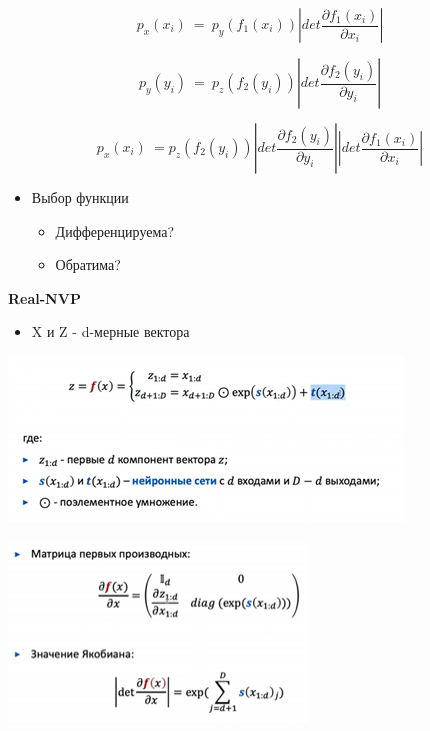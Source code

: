 \documentclass[a4paper, 12pt]{article}
\begin{document}
\[p_{x}(x_{i})\  = \ p_{y}(f_{1}(x_{i}))|det\frac{\partial f_{1}(x_{i})}{\partial x_{i}}|\]

\[p_{y}(y_{i})\  = \ p_{z}(f_{2}(y_{i}))|det\frac{\partial f_{2}(y_{i})}{\partial y_{i}}|\]

\[p_{x}(x_{i})\  = p_{z}(f_{2}(y_{i}))|det\frac{\partial f_{2}(y_{i})}{\partial y_{i}}||det\frac{\partial f_{1}(x_{i})}{\partial x_{i}}|\]


\begin{itemize}
\item
  
  {{Выбор функции}}
  

  \begin{itemize}
  \item
    
    Дифференцируема?
    
  \item
    
    Обратима?
    
  \end{itemize}
\end{itemize}

\centering \textbf{Real-NVP}

\begin{itemize}
\item
  
  X и Z - d-мерные вектора
  
\end{itemize}


\includegraphics[width=4.12500in,height=1.73135in]{media/image6.png}

\includegraphics[width=3.12500in,height=1.90179in]{media/image19.png}
\end{document}
